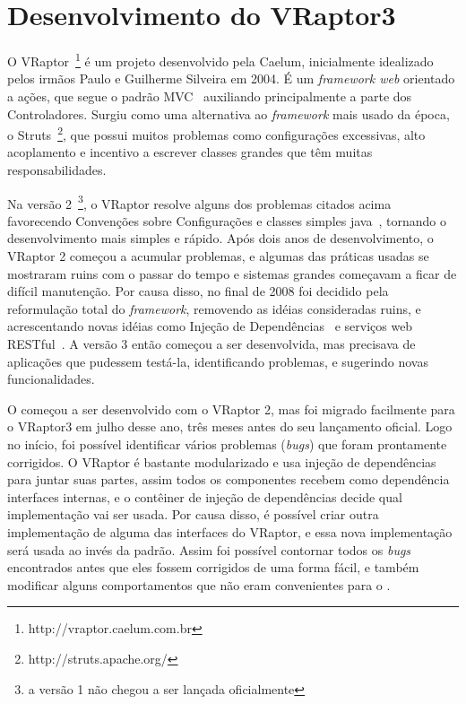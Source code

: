 \section{Desenvolvimento do VRaptor3}
\label{app:vraptor}

O VRaptor~\footnote{http://vraptor.caelum.com.br} é um projeto \opensource{} desenvolvido pela Caelum, inicialmente idealizado pelos irmãos Paulo e Guilherme Silveira em 2004. É um \textit{framework web} orientado a ações, que segue o padrão MVC~\cite{mvc} auxiliando principalmente a parte dos Controladores. Surgiu como uma alternativa ao \textit{framework} mais usado da época, o Struts~\footnote{http://struts.apache.org/}, que possui muitos problemas como configurações excessivas, alto acoplamento e incentivo a escrever classes grandes que têm muitas responsabilidades.

Na versão 2~\footnote{a versão 1 não chegou a ser lançada oficialmente}, o VRaptor resolve alguns dos problemas citados acima favorecendo Convenções sobre Configurações e classes simples java~\cite{pojo}, tornando o desenvolvimento mais simples e rápido. Após dois anos de desenvolvimento, o VRaptor 2 começou a acumular problemas, e algumas das práticas usadas se mostraram ruins com o passar do tempo e sistemas grandes começavam a ficar de difícil manutenção. Por causa disso, no final de 2008 foi decidido pela reformulação total do \textit{framework}, removendo as idéias consideradas ruins, e acrescentando novas idéias como Injeção de Dependências~\cite{di} e serviços web RESTful~\cite{rest}. A versão 3 então começou a ser desenvolvida, mas precisava de aplicações que pudessem testá-la, identificando problemas, e sugerindo novas funcionalidades.

O \calopsita{} começou a ser desenvolvido com o VRaptor 2, mas foi migrado facilmente para o VRaptor3 em julho desse ano, três meses antes do seu lançamento oficial. Logo no início, foi possível identificar vários problemas (\textit{bugs}) que foram prontamente corrigidos. O VRaptor é bastante modularizado e usa injeção de dependências para juntar suas partes, assim todos os componentes recebem como dependência interfaces internas, e o contêiner de injeção de dependências decide qual implementação vai ser usada. Por causa disso, é possível criar outra implementação de alguma das interfaces do VRaptor, e essa nova implementação será usada ao invés da padrão. Assim foi possível contornar todos os \textit{bugs} encontrados antes que eles fossem corrigidos de uma forma fácil, e também modificar alguns comportamentos que não eram convenientes para o \calopsita.

